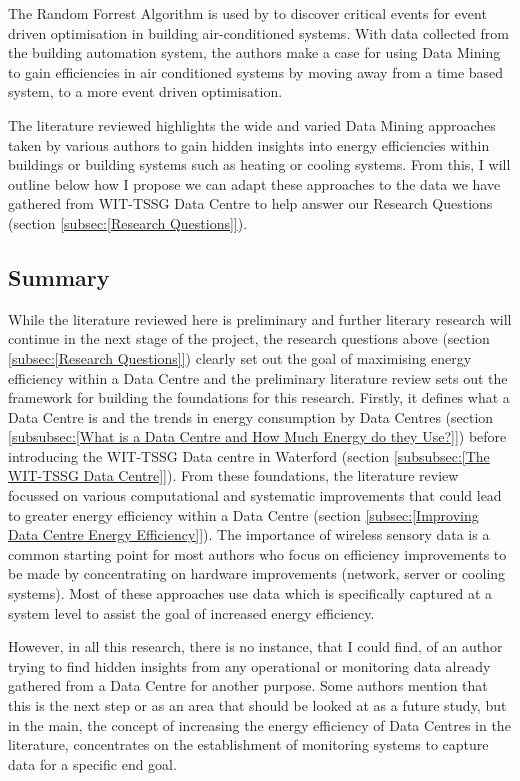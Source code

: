 \documentclass[12pt]{scrartcl}
\begin{document}
The Random Forrest Algorithm is used by \citet{WANG2017251} to discover critical events for event driven optimisation in building air-conditioned systems. With data collected from the building automation system, the authors make a case for using Data Mining to gain efficiencies in air conditioned systems by moving away from a time based system, to a more event driven optimisation.  

The literature reviewed highlights the wide and varied Data Mining approaches taken by various authors to gain hidden insights into energy efficiencies within buildings or building systems such as heating or cooling systems. From this, I will outline below how I propose we can adapt these approaches to the data we have gathered from WIT-TSSG Data Centre to help answer our Research Questions (section \ref{subsec:[Research Questions]}).   

\subsection{Summary}  
\label{subsec:[Summary]}
While the literature reviewed here is preliminary and further literary research will continue in the next stage of the project, the research questions above (section \ref{subsec:[Research Questions]}) clearly set out the goal of maximising energy efficiency within a Data Centre and the preliminary literature review sets out the framework for building the foundations for this research. Firstly, it defines what a Data Centre is and the trends in energy consumption by Data Centres (section \ref{subsubsec:[What is a Data Centre and How Much Energy do they Use?]}) before introducing the WIT-TSSG Data centre in Waterford (section \ref{subsubsec:[The WIT-TSSG Data Centre]}). From these foundations, the literature review focussed on various computational and systematic improvements that could lead to greater energy efficiency within a Data Centre (section \ref{subsec:[Improving Data Centre Energy Efficiency]}). The importance of wireless sensory data is a common starting point for most authors who focus on efficiency improvements to be made by concentrating on hardware improvements (network, server or cooling systems). Most of these approaches use data which is specifically captured at a system level to assist the goal of increased energy efficiency.

However, in all this research, there is no instance, that I could find, of an author trying to find hidden insights from any operational or monitoring data already gathered from a Data Centre for another purpose. Some authors mention that this is the next step or as an area that should be looked at as a future study, but in the main, the concept of increasing the energy efficiency of Data Centres in the literature, concentrates on the establishment of monitoring systems to capture data for a specific end goal. 
\end{document}
